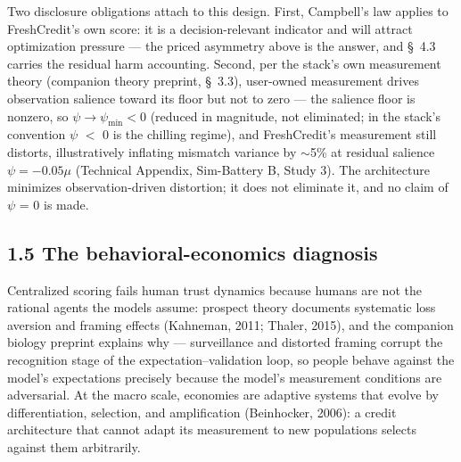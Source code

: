 \documentclass[11pt,twocolumn]{article}
\begin{document}
Two disclosure obligations attach to this design. First, Campbell's law applies to FreshCredit's own score: it is a decision-relevant indicator and will attract optimization pressure --- the priced asymmetry above is the answer, and \S~4.3 carries the residual harm accounting. Second, per the stack's own measurement theory (companion theory preprint, \S~3.3), user-owned measurement drives observation salience toward its floor but not to zero --- the salience floor is nonzero, so $\psi \rightarrow \psi_{\min} < 0$ (reduced in magnitude, not eliminated; in the stack's convention $\psi$ $<$ 0 is the chilling regime), and FreshCredit's measurement still distorts, illustratively inflating mismatch variance by $\sim$5\% at residual salience $\psi = -0.05\mu$ (Technical Appendix, Sim-Battery B, Study 3). The architecture minimizes observation-driven distortion; it does not eliminate it, and no claim of $\psi$ = 0 is made.

\subsection*{1.5 The behavioral-economics diagnosis}

Centralized scoring fails human trust dynamics because humans are not the rational agents the models assume: prospect theory documents systematic loss aversion and framing effects (Kahneman, 2011; Thaler, 2015), and the companion biology preprint explains why --- surveillance and distorted framing corrupt the recognition stage of the expectation--validation loop, so people behave against the model's expectations precisely because the model's measurement conditions are adversarial. At the macro scale, economies are adaptive systems that evolve by differentiation, selection, and amplification (Beinhocker, 2006): a credit architecture that cannot adapt its measurement to new populations selects against them arbitrarily.
\end{document}
